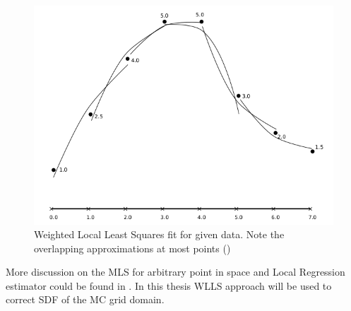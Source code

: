 \begin{figure}[H]
	\begin{center}
		\includegraphics[width=\textwidth]{figures/WLLS.png}
	\end{center}
	\caption{Weighted Local Least Squares fit for given data. Note the overlapping approximations at most points (\cite{MLSIntro})}
	\label{fig:WLLS}
\end{figure}

More discussion on the MLS for arbitrary point in space and Local Regression estimator could be found in \cite{MLSIntro}. In this thesis WLLS approach will be used to correct SDF of the MC grid domain.

